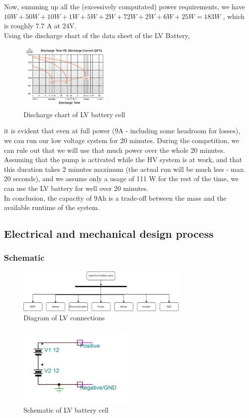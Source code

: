 Now, summing up all the (excessively computated) power requirements, we have
\(10W + 50W + 10W + 1W + 5W + 2W + 72W + 2W + 6W + 25W = 183W \) , which is roughly 7.7 A at 24V. \\
Using the discharge chart of the data sheet of the LV Battery,
\begin{figure}
    \centering
    \includegraphics[width=0.4\textwidth]{texfiles/elec/eimg/LV_Battery_WP1236W}
    \caption{Discharge chart of LV battery cell}
\end{figure}
it is evident that even at full power (9A - including some headroom for losses), we can run our low voltage system for 20 minutes. During the competition, we can rule out that we will use that much power over the whole 20 minutes. 
Assuming that the pump is activated while the HV system is at work, and that this duration takes 2 minutes maximum (the actual run will be much less - max. 20 seconds), and we assume only a usage of 111 W for the rest of the time,
we can use the LV battery for well over 20 minutes. \\
In conclusion, the capacity of 9Ah is a trade-off between the mass and the available runtime of the system.
\subsection{Electrical and mechanical design process}
\subsubsection{Schematic}
\begin{figure}[h]
    \centering
    \includegraphics[width=0.75\textwidth]{texfiles/elec/eimg/LV_Diagram}
    \caption{Diagram of LV connections}
\end{figure}
\begin{figure}[h]
    \centering
    \includegraphics[width=0.5\textwidth]{texfiles/elec/eimg/LVCircuit}
    \caption{Schematic of LV battery cell}
\end{figure}
